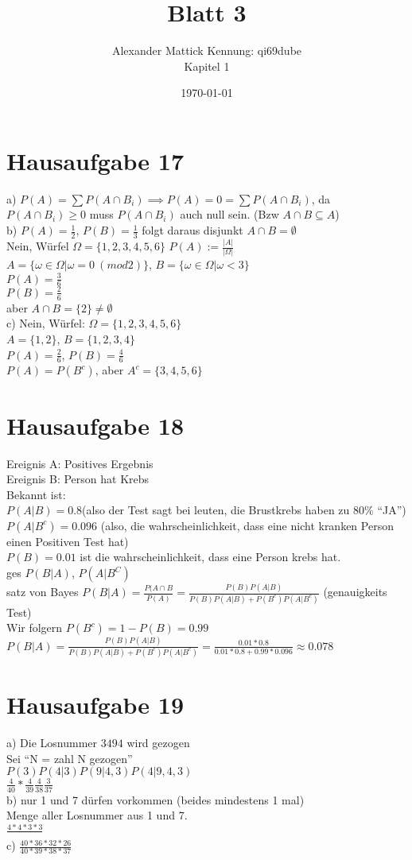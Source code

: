 \documentclass{article}
\author{
Alexander Mattick Kennung: qi69dube\\
Kapitel 1
}
\date{\today}
\title{Blatt 3}
\begin{document}
	\section{Hausaufgabe 17}
	a) $P(A)=\sum P(A\cap B_i)\implies P(A)=0 = \sum P(A\cap B_i)$, da $P(A\cap B_i)\geq 0$ muss $P(A\cap B_i)$ auch null sein. (Bzw $A\cap B\subseteq A$)\\
	b) $P(A)=\frac{1}{2}$, $P(B)=\frac{1}{3}$ folgt daraus disjunkt $A\cap B = \emptyset$\\
	Nein, Würfel $\Omega = \{1,2,3,4,5,6\}$ $P(A):= \frac{|A|}{|\Omega|}$\\
	$A=\{\omega\in\Omega| \omega=0\ (mod 2)\}$, $B=\{\omega\in\Omega| \omega<3\}$\\
	$P(A) = \frac{3}{6}$\\
	$P(B)=\frac{2}{6}$\\
	aber $A\cap B  = \{2\}\neq \emptyset$\\
	c) Nein, Würfel: $\Omega = \{1,2,3,4,5,6\}$\\
	$A= \{1,2\}$, $B=\{1,2,3,4\}$\\
	$P(A)=\frac{2}{6}$, $P(B)=\frac{4}{6}$\\
	$P(A)=P(B^c)$, aber $A^c = \{3,4,5,6\}$\\
	\section{Hausaufgabe 18}
	Ereignis A: Positives Ergebnis\\
	Ereignis B: Person hat Krebs\\
	Bekannt ist:\\
	$P(A|B) = 0.8$(also der Test sagt bei leuten, die Brustkrebs haben zu $80\%$ ``JA'')\\
	$P(A|B^c) = 0.096$ (also, die wahrscheinlichkeit, dass eine nicht kranken Person einen Positiven Test hat)\\
	$P(B)=0.01$ ist die wahrscheinlichkeit, dass eine Person krebs hat.\\
	ges $P(B|A)$, $P(A|B^C)$\\
	satz von Bayes $P(B|A) = \frac{P(A\cap B}{P(A)} = \frac{P(B)P(A|B)}{P(B)P(A|B)+P(B^c)P(A|B^c)}$ (genauigkeits Test)\\
	Wir folgern $P(B^c)=1-P(B)=0.99$\\
	$P(B|A) = \frac{P(B)P(A|B)}{P(B)P(A|B)+P(B^c)P(A|B^c)}=\frac{0.01*0.8}{0.01*0.8+0.99*0.096}\approx 0.078$\\
	\section{Hausaufgabe 19}
	a) Die Losnummer $3494$ wird gezogen\\
	Sei ``N = zahl N gezogen''\\
	$P(3)P(4|3)P(9|4,3)P(4|9,4,3)$\\
	$\frac{4}{40}*\frac{4}{39}\frac{4}{38}\frac{3}{37}$\\
	b) nur 1 und 7 dürfen vorkommen (beides mindestens 1 mal)\\
	Menge aller Losnummer aus 1 und 7.\\
	$\frac{4*4*3*3}{}$\\
	c) $\frac{40*36*32*26}{40*39*38*37}$
\end{document}
